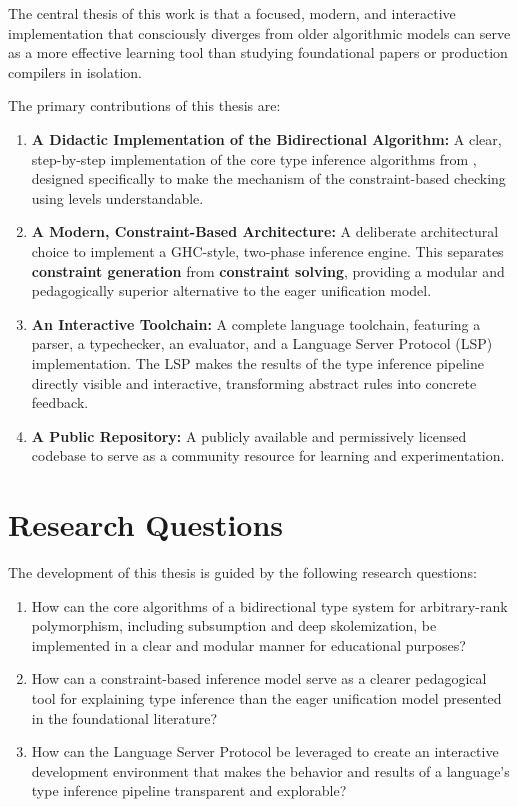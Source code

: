 The central thesis of this work is that a focused, modern, and interactive implementation that consciously diverges from older algorithmic models can serve as a more effective learning tool than studying foundational papers or production compilers in isolation.

The primary contributions of this thesis are:
\begin{enumerate}
    \item \textbf{A Didactic Implementation of the Bidirectional Algorithm:} A clear, step-by-step implementation of the core type inference algorithms from \cite{jones-practical-2007}, designed specifically to make the mechanism of the constraint-based checking using levels understandable.
    \item \textbf{A Modern, Constraint-Based Architecture:} A deliberate architectural choice to implement a GHC-style, two-phase inference engine. This separates \textbf{constraint generation} from \textbf{constraint solving}, providing a modular and pedagogically superior alternative to the eager unification model.
    \item \textbf{An Interactive Toolchain:} A complete language toolchain, featuring a parser, a typechecker, an evaluator, and a Language Server Protocol (LSP) implementation. The LSP makes the results of the type inference pipeline directly visible and interactive, transforming abstract rules into concrete feedback.
    \item \textbf{A Public Repository:} A publicly available and permissively licensed codebase \cite{deemp-arbitrary-rank-tutorial} to serve as a community resource for learning and experimentation.
\end{enumerate}

\section{Research Questions}

The development of this thesis is guided by the following research questions:
\begin{enumerate}
    \item How can the core algorithms of a bidirectional type system for arbitrary-rank polymorphism, including subsumption and deep skolemization, be implemented in a clear and modular manner for educational purposes?
    \item How can a constraint-based inference model serve as a clearer pedagogical tool for explaining type inference than the eager unification model presented in the foundational literature?
    \item How can the Language Server Protocol be leveraged to create an interactive development environment that makes the behavior and results of a language's type inference pipeline transparent and explorable?
\end{enumerate}

